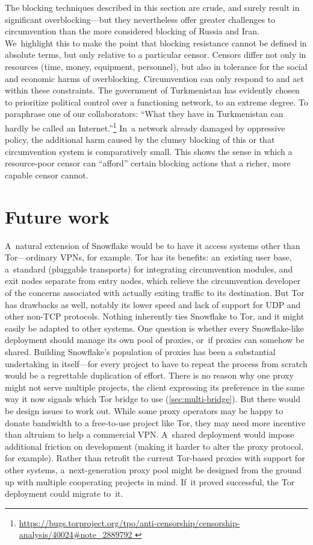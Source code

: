 \documentclass[letterpaper,twocolumn]{article}
\newlength{\urlfootnotesize}
\newcommand{\urlfootnote}[1]{\footnote{
\raggedright\fontsize{\urlfootnotesize}{\urlfootnotesize}\selectfont\url{#1}
}}
\begin{document}
The blocking techniques described in this section are crude,
and surely result in significant overblocking---but
they nevertheless offer greater challenges to circumvention
than the more considered blocking of Russia and Iran.
We~highlight this to make the point that blocking resistance
cannot be defined in absolute terms,
but only relative to a particular censor.
Censors differ not only in resources
(time, money, equipment, personnel),
but also in tolerance
for the social and economic harms of overblocking.
Circumvention can only respond to and act within these constraints.
The government of Turkmenistan has evidently chosen
to prioritize political control
over a functioning network, to an extreme degree.
To paraphrase one of our collaborators:
``What they have in Turkmenistan can hardly be called an Internet.''\urlfootnote{
https://bugs.torproject.org/tpo/anti-censorship/censorship-analysis/40024\#note_2889792
}
In~a network already damaged by oppressive policy,
the additional harm caused by the clumsy blocking of
this or that circumvention system is comparatively small.
This shows the sense in which a resource-poor censor
can ``afford'' certain blocking actions
that a richer, more capable censor cannot.

\section{Future work}
\label{sec:future}

A~natural extension of Snowflake would be
to have it access systems other than Tor---ordinary
VPNs, for example.
Tor has its benefits:
an~existing user base,
a~standard (pluggable transports) for integrating
circumvention modules,
and exit nodes separate from entry nodes,
which relieve the circumvention developer of the concerns associated
with actually exiting traffic to its destination.
But Tor has drawbacks as well,
notably its lower speed and
lack of support for UDP and other non-TCP protocols.
Nothing inherently ties Snowflake to Tor,
and it might easily be adapted to other systems.
One question is whether every Snowflake-like deployment
should manage its own pool of proxies,
or~if proxies can somehow be shared.
Building Snowflake's population of proxies
has been a substantial undertaking in itself---for
every project to have to repeat the process from scratch
would be a regrettable duplication of effort.
There is no reason why one proxy might not
serve multiple projects,
the client expressing its preference
in the same way it now signals which Tor bridge to use (\autoref{sec:multi-bridge}).
But there would be design issues to work out.
While some proxy operators may be happy to donate
bandwidth to a free-to-use project like Tor,
they may need more incentive than altruism to help a commercial VPN.
A~shared deployment would impose additional friction on development
(making it harder to alter the proxy protocol, for example).
Rather than retrofit the current Tor-based proxies
with support for other systems,
a~next-generation proxy pool might be designed
from the ground up with multiple cooperating projects in mind.
If~it proved successful,
the Tor deployment could migrate to~it.
\end{document}
